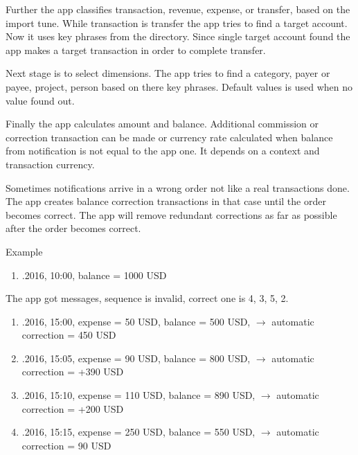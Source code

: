 \documentclass[a4paper,10pt,english]{sphinxmanual}
\begin{document}
\sphinxAtStartPar
Further the app classifies transaction, revenue, expense, or transfer, based on the import tune.
While transaction is transfer the app tries to find a target account. Now it uses key phrases from the
 directory. Since single target account found the app makes a target transaction
in order to complete transfer.

\sphinxAtStartPar
Next stage is to select dimensions. The app tries to find a category, payer or payee, project, person
based on there key phrases. Default values is used when no value found out.

\sphinxAtStartPar
Finally the app calculates amount and balance. Additional commission or correction
transaction can be made or currency rate calculated when balance from notification is not equal to the app one.
It depends on a context and transaction currency.

\sphinxAtStartPar
Sometimes notifications arrive in a wrong order not like a real transactions done. The app
creates balance correction transactions in that case until the order becomes correct.
The app will remove redundant corrections as far as possible after the order becomes correct.

\sphinxAtStartPar
Example
\begin{enumerate}
%
\item {} 
.2016, 10:00, balance = 1000 USD

\end{enumerate}

\sphinxAtStartPar
The app got messages, sequence is invalid, correct one is 4, 3, 5, 2.
\begin{enumerate}
%
\setcounter{enumi}{1}
\item {} 
.2016, 15:00, expense = \sphinxhyphen{}50 USD, balance = 500 USD, \(\rightarrow\) automatic correction = \sphinxhyphen{}450 USD

\item {} 
.2016, 15:05, expense = \sphinxhyphen{}90 USD, balance = 800 USD, \(\rightarrow\) automatic correction = +390 USD

\item {} 
.2016, 15:10, expense = \sphinxhyphen{}110 USD, balance = 890 USD, \(\rightarrow\) automatic correction = +200 USD

\item {} 
.2016, 15:15, expense = \sphinxhyphen{}250 USD, balance = 550 USD, \(\rightarrow\) automatic correction = \sphinxhyphen{}90 USD

\end{enumerate}
\end{document}
